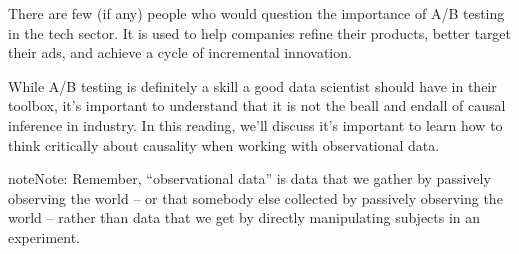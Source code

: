 \documentclass[letterpaper,10pt,english]{jupyterBook}
\begin{document}
\sphinxAtStartPar
There are few (if any) people who would question the importance of A/B testing in the tech sector. It is used  to help companies refine their products, better target their ads, and achieve a cycle of incremental innovation.

\sphinxAtStartPar
While A/B testing is definitely a skill a good data scientist should have in their toolbox, it’s important to understand that it is not the be\sphinxhyphen{}all and end\sphinxhyphen{}all of causal inference in industry. In this reading, we’ll discuss  it’s important to learn how to think critically about causality when working with observational data.

\begin{sphinxadmonition}{note}{Note:}
\sphinxAtStartPar
Remember, “observational data” is data that we gather by passively observing the world – or that somebody else collected by passively observing the world – rather than data that we get by directly manipulating subjects in an experiment.
\end{sphinxadmonition}
\end{document}
